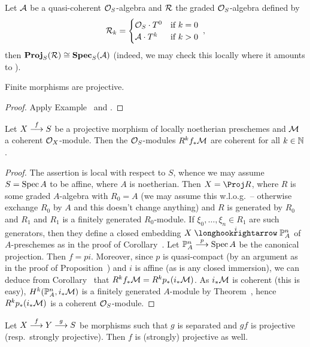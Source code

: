 \documentclass[a4paper,parskip=half,numbers=enddot, DIV=12]{scrreprt}
\begin{document}
\begin{example}
	Let $\mathcal{A}$ be a quasi-coherent $\mathcal{O}_S$-algebra and $\mathcal{R}$ the graded $\mathcal{O}_S$-algebra defined by
	\begin{align*}
		\mathcal{R}_k=\begin{cases}
			\mathcal{O}_S\cdot T^0 & \text{if }k=0\\
			\mathcal{A}\cdot T^k & \text{if }k>0
		\end{cases}\;,
	\end{align*}
	then $\operatorname{\mathbf{Proj}}_S(\mathcal{R})\cong \operatorname{\mathbf{Spec}}_S(\mathcal{A})$ (indeed, we may check this locally where it amounts to \cite[Example~2.6.2]{alggeo1}).
\end{example}
\begin{cor}
	Finite morphisms are projective.
\end{cor}
\begin{proof}
	Apply Example~ and \cite[Lemma~2.5.1]{alggeo1}.
\end{proof}
\begin{thm}
	Let $X\morphism[f]S$ be a projective morphism of locally noetherian preschemes and $\mathcal{M}$ a coherent $\mathcal{O}_X$-module. Then the $\mathcal{O}_S$-modules $R^kf_*\mathcal{M}$ are coherent for all $k\in\mathbb{N}$.
\end{thm}
\begin{proof}
	The assertion is local with respect to $S$, whence we may assume $S=\operatorname{Spec} A$ to be affine, where $A$ is noetherian. Then $X=\Proj R$, where $R$ is some graded $A$-algebra with $R_0=A$ (we may assume this w.l.o.g.\ -- otherwise exchange $R_0$ by $A$ and this doesn't change anything) and $R$ is generated by $R_0$ and $R_1$ and $R_1$ is a finitely generated $R_0$-module. If $\xi_0,\ldots,\xi_n\in R_1$ are such generators, then they define a closed embedding $X\monomorphism[i]\IP_A^n$ of $A$-preschemes as in the proof of Corollary~. Let $\IP_A^n\morphism[p] \Spec A$ be the canonical projection. Then $f=pi$. Moreover, since $p$ is quasi-compact (by an argument as in the proof of Proposition~) and $i$ is affine (as is any closed immersion), we can deduce from Corollary~ that $R^kf_*\mathcal{M}=R^kp_*(i_*\mathcal{M})$. As $i_*\mathcal{M}$ is coherent (this is easy), $H^k(\mathbb{P}_A^n,i_*\mathcal{M})$ is a finitely generated $A$-module by Theorem~, hence $R^kp_*(i_*\mathcal{M})$ is a coherent $\mathcal{O}_S$-module.
\end{proof}
\begin{prop}
	Let $X\morphism[f]Y\morphism[g]S$ be morphisms such that $g$ is separated and $gf$ is projective (resp.\ strongly projective). Then $f$ is (strongly) projective as well.
\end{prop}
\end{document}
